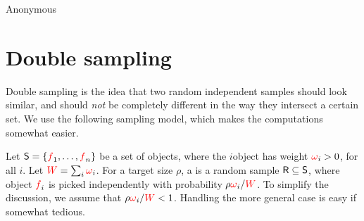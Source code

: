 % 

\makeatletter
{}
\makeatother
\ifx\bookMode\undefined%
\fi
{}


\ChapterPrefix{}
\ChapterGen{}



%
{}%
{Anonymous}

\bigskip%





\section{Double sampling}

Double sampling is the idea that two random independent samples should
look similar, and should \emph{not} be completely different in the way
they intersect a certain set. We use the following sampling model,
which makes the computations somewhat easier.

\begin{defn}
    Let $\mathsf{S} = \left\{ { {\textcolor{red}{f}}_1, \ldots, {\textcolor{red}{f}}_n} \right\}$ be a set of objects,
    where the $i$\th object has weight ${\textcolor{red}{\omega}}_i > 0$, for all $i$. Let
    ${\textcolor{red}{W}} = \sum_i {\textcolor{red}{\omega}}_i$.  For a target size $\rho$, a
     is a random sample
    $\mathsf{R} \subseteq \mathsf{S}$, where object ${\textcolor{red}{f}}_i$ is picked
    independently with probability
    $\displaystyle \rho {\textcolor{red}{\omega}}_i / {\textcolor{red}{W}}$. To simplify the discussion,
    we assume that $\rho {\textcolor{red}{\omega}}_i / {\textcolor{red}{W}} < 1$. Handling the more
    general case is easy if somewhat tedious.
\end{defn}



